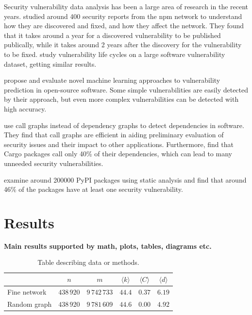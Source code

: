 \documentclass[9pt,twocolumn,twoside]{pnas-report}
\begin{document}
Security vulnerability data analysis has been a large area of research in the recent years.
\cite{decan2018vulnerabilities} studied around 400 security reports from the npm network to understand how they are discovered and fixed, and how they affect the network.
They found that it takes around a year for a discovered vulnerability to be published publically, while it takes around 2 years after the discovery for the vulnerability to be fixed.
\cite{shahzad2012} study vulnerability life cycles on a large software vulnerability dataset, getting similar results.

\cite{HANIF2021103009} propose and evaluate novel machine learning approaches to vulnerability prediction in open-source software.
Some simple vulnerabilities are easily detected by their approach, but even more complex vulnerabilities can be detected with high accuracy.

\cite{hejderup2018} use call graphs instead of dependency graphs to detect dependencies in software.
They find that call graphs are efficient in aiding preliminary evaluation of security issues and their impact to other applications.
Furthermore, \cite{hejderup2022prazi} find that Cargo packages call only 40\% of their dependencies, which can lead to many unneeded security vulnerabilities.

\cite{ruohonen2021} examine around 200000 PyPI packages using static analysis and find that around 46\% of the packages have at least one security vulnerability.


\nocite{Kle00,Bou05,EB07,New08,For10,New12,FH16,PLC17,PDL18,Pei20}

\section*{Results}

 {\bf Main results supported by math, plots, tables, diagrams etc.}
\lipsum[1]

\begin{table}[h]\centering%
	\caption{Table describing data or methods.}
	\begin{tabular}{lccccc}\toprule
		             & $n$        & $m$           & $\langle k\rangle$ & $\langle C\rangle$ & $\langle d\rangle$ \\\midrule
		Fine network & $438\,920$ & $9\,742\,733$ & $44.4$             & $0.37$             & $6.19$             \\
		Random graph & $438\,920$ & $9\,781\,609$ & $44.6$             & $0.00$             & $4.92$             \\\bottomrule
	\end{tabular}
	\label{tbl:example}
\end{table}
\end{document}
